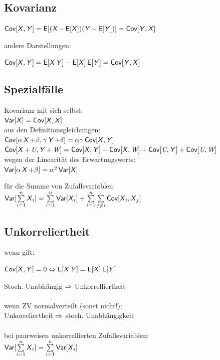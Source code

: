 \documentclass[german,color,6pt]{latex4ei/latex4ei_sheet}
\DeclareMathOperator{\U}{\textit{U}}				%
\DeclareMathOperator{\V}{\textit{W}}				%
\begin{document}
\begin{sectionbox}
	\subsection{Kovarianz}
	
	\begin{emphbox}
		{$\Cov [\X,\Y] = \E[(\X- \E[\X])(\Y - \E[\Y])] = \Cov [\Y, \X]$}
	\end{emphbox}
	
	andere Darstellungen:
	
	$\Cov [\X,\Y] = \E [\X\Y] - \E[\X] \E[\Y] = \Cov[\Y, \X]$
\end{sectionbox}

\begin{sectionbox}
	\subsection{Spezialfälle}
	Kovarianz mit sich selbst:  \\
	$\Var [\X] = \Cov [\X,\X]$ \\
	
	aus den Definitionsgleichungen: \\
	$\Cov [\alpha \X + \beta, \gamma \Y + \delta] = \alpha \gamma \Cov [\X, \Y]$ \\
	$\Cov [ \X + \U, \Y + \V] = \Cov [\X, \Y] + \Cov [\X, \V] + \Cov [\U, \Y] + \Cov [\U, \V]$ \\
	
	wegen der Linearität des Erwartungswerts: \\
	$\Var [ \alpha \X + \beta] = \alpha^2 \Var [\X]$
	
	für die Summe von Zufallsvariablen: \\
	$\Var [\sum \limits_{i=1}^n \X_i] = \sum \limits_{i=1}^{n} \Var [\X_i] + \sum \limits_{i=1}^{n} \sum \limits_{j \not= i} \Cov [\X_i, 	\X_j]$ \\
\end{sectionbox}

\begin{sectionbox}
	\subsection{Unkorreliertheit}
	wenn gilt:\\
	\begin{emphbox}
		$\Cov [\X,\Y] = 0 \Leftrightarrow \E[\X\Y] = \E[\X] \E[\Y]$
	\end{emphbox}
	Stoch. Unabhängig $\Ra$ Unkorrelliertheit \\\\
	wenn ZV normalverteilt (sonst nicht!):\\
	Unkorreliertheit $\Ra$ stoch. Unabhängigkeit\\\\
	bei paarweisen unkorrellierten Zufallsvariablen:\\
	$\Var[\sum \limits_{i=1}^{n} \X_i] = \sum \limits_{i=1}^{n} \Var [\X_i]$
\end{sectionbox}
\end{document}
